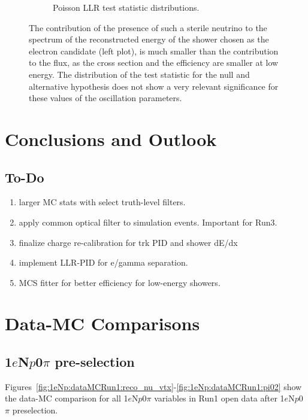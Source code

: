 \documentclass[a4paper]{article}
\newcommand{\npsel}{1$e$N$p$0$\pi$ }
\begin{document}
\begin{figure}[ht]
\begin{center}
\begin{subfigure}[b]{0.45\textwidth}
    \caption{Poisson LLR test statistic distributions.}
    \end{subfigure}
\caption{The contribution of the presence of such a sterile neutrino to the spectrum of the reconstructed energy of the shower chosen as the electron candidate (left plot), is much smaller than the contribution to the flux, as the cross section and the efficiency are smaller at low energy.
The distribution of the test statistic for the null and alternative hypothesis does not show a very relevant significance for these values of the oscillation parameters.}
\label{fig:oscillation_sensitivity}
\end{center}
\end{figure}




\newpage
\section{Conclusions and Outlook}

\subsection{To-Do}
\begin{enumerate}
    \item larger MC stats with select truth-level filters.
    \item apply common optical filter to simulation events. Important for Run3.
    \item finalize charge re-calibration for trk PID and shower dE/dx
    \item implement LLR-PID for e/gamma separation.
    \item MCS fitter for better efficiency for low-energy showers.

\end{enumerate}{}

\newpage

\appendix

\section{Data-MC Comparisons}
\label{sec:datamc:plots}

\subsection{\npsel pre-selection}

Figures~\ref{fig:1eNp:dataMCRun1:reco_nu_vtx}-\ref{fig:1eNp:dataMCRun1:pi02} show the data-MC comparison for all \npsel variables in Run1 open data after \npsel preselection.
\end{document}
